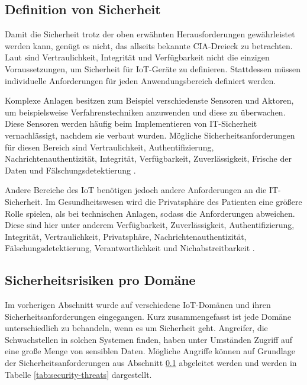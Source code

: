 \subsection{Definition von Sicherheit}\label{sec:def-security}
Damit die Sicherheit trotz der oben erwähnten Herausforderungen ge\-währ\-lei\-stet
werden kann, genügt es nicht, das allseits bekannte CIA-Dreieck zu betrachten.
Laut \cite{paper} sind Vertraulichkeit, Integrität und Verfügbarkeit nicht die
einzigen Voraussetzungen, um Sicherheit für IoT-Geräte zu definieren.
Stattdessen müssen individuelle Anforderungen für jeden Anwendungsbereich
definiert werden.

Komplexe Anlagen besitzen zum Beispiel verschiedenste Sensoren und Aktoren, um
beispielsweise Verfahrenstechniken anzuwenden und diese zu über\-wachen. Diese
Sensoren werden häufig beim Implementieren von IT-Sich\-er\-heit vernachlässigt,
nachdem sie verbaut wurden. Mögliche Sicherheitsanforderungen für
diesen Bereich sind Vertraulichkeit, Authentifizierung,
Nachrichtenauthentizität, Integrität, Verfügbarkeit, Zuverlässigkeit, Frische
der Daten und Fälschungsdetektierung \cite{paper}.

Andere Bereiche des IoT benötigen jedoch andere Anforderungen an die
IT-Sicherheit. Im Gesundheitswesen wird die Privatsphäre des Patienten eine
größere Rolle spielen, als bei technischen Anlagen, sodass die Anforderungen
abweichen. Diese sind hier unter anderem Verfügbarkeit, Zuverlässigkeit,
Authentifizierung, Integrität, Vertraulichkeit, Privatsphäre,
Nachrichtenauthentizität, Fälschungsdetektierung, Verantwortlichkeit und
Nichabstreitbarkeit \cite{paper}.

\subsection{Sicherheitsrisiken pro Domäne}
Im vorherigen Abschnitt wurde auf verschiedene IoT-Domänen und ihren
Sicherheitsanforderungen eingegangen. Kurz zusammengefasst ist jede Domäne
unterschiedlich zu behandeln, wenn es um Sicherheit geht. Angreifer, die
Schwachstellen in solchen Systemen finden, haben unter Umständen Zugriff auf
eine große Menge von sensiblen Daten. Mögliche Angriffe können auf Grundlage der
Sicherheitsanforderungen aus Abschnitt \ref{sec:def-security} abgeleitet werden
\cite{paper} und werden in Tabelle \ref{tab:security-threats} dargestellt.

